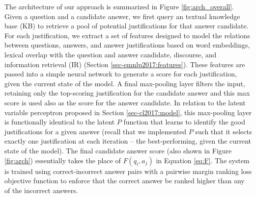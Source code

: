 The architecture of our approach is summarized in Figure \ref{fig:arch_overall}.  
Given a question and a candidate answer, we first query an textual knowledge base (KB) to retrieve a pool of potential justifications for that answer candidate.  
For each justification, we extract a set of features designed to model the relations between questions, answers, and answer justifications based on word embeddings, lexical overlap with the question and answer candidate, discourse, and information retrieval (IR) (Section \ref{sec-emnlp2017:features}).
These features are passed into a simple neural network to generate a score for each justification, given the current state of the model.  A final max-pooling layer filters the input, retaining only the top-scoring justification for the candidate answer and this max score is used also as the score for the answer candidate.  In relation to the latent variable perceptron proposed in Section \ref{sec-cl2017:model}, this max-pooling layer is functionally identical to the latent $P$ function that learns to identify the good justifications for a given answer (recall that we implemented $P$ such that it selects exactly one justification at each iteration -- the best-performing, given the current state of the model).
The final candidate answer score (also shown in Figure \ref{fig:arch}) essentially takes the place of $F(q_i, a_j)$ in Equation \ref{eq:F}.     
The system is trained using correct-incorrect answer pairs with a pairwise margin ranking loss objective function to enforce that the correct answer be ranked higher than any of the incorrect answers. 


